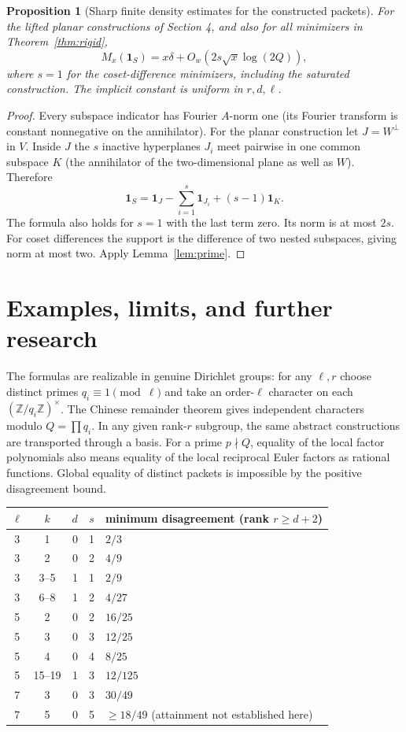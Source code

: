 \documentclass[11pt]{article}
\newtheorem{proposition}[theorem]{Proposition}
\theoremstyle{remark}\newtheorem{remark}[theorem]{Remark}
\newcommand{\Z}{\mathbb Z}
\newcommand{\ind}{\mathbf 1}
\begin{document}
\begin{proposition}[Sharp finite density estimates for the constructed packets]\label{prop:finiteext}
For the lifted planar constructions of Section 4, and also for all minimizers in Theorem~\ref{thm:rigid},
\[
 M_x(\ind_S)=x\delta+O_w(2s\sqrt x\log(2Q)),
\]
where $s=1$ for the coset-difference minimizers, including the saturated construction. The implicit constant is uniform in $r,d,\ell$.
\end{proposition}
\begin{proof}
Every subspace indicator has Fourier $A$-norm one (its Fourier transform is constant nonnegative on the annihilator). For the planar construction let $J=W^\perp$ in $V$. Inside $J$ the $s$ inactive hyperplanes $J_i$ meet pairwise in one common subspace $K$ (the annihilator of the two-dimensional plane as well as $W$). Therefore
\[
 \ind_S=\ind_J-\sum_{i=1}^s\ind_{J_i}+(s-1)\ind_K.
\]
The formula also holds for $s=1$ with the last term zero. Its norm is at most $2s$. For coset differences the support is the difference of two nested subspaces, giving norm at most two. Apply Lemma~\ref{lem:prime}.
\end{proof}

\section{Examples, limits, and further research}
The formulas are realizable in genuine Dirichlet groups: for any $\ell,r$ choose distinct primes $q_i\equiv1\pmod\ell$ and take an order-$\ell$ character on each $(\Z/q_i\Z)^\times$. The Chinese remainder theorem gives independent characters modulo $Q=\prod q_i$. In any given rank-$r$ subgroup, the same abstract constructions are transported through a basis. For a prime $p\nmid Q$, equality of the local factor polynomials also means equality of the local reciprocal Euler factors as rational functions. Global equality of distinct packets is impossible by the positive disagreement bound.

\begin{center}
\begin{tabular}{ccrrl}
\toprule
$\ell$ & $k$ & $d$ & $s$ & minimum disagreement (rank $r\ge d+2$)\\
\midrule
3 & 1 & 0 & 1 & $2/3$\\
3 & 2 & 0 & 2 & $4/9$\\
3 & 3--5 & 1 & 1 & $2/9$\\
3 & 6--8 & 1 & 2 & $4/27$\\
5 & 2 & 0 & 2 & $16/25$\\
5 & 3 & 0 & 3 & $12/25$\\
5 & 4 & 0 & 4 & $8/25$\\
5 & 15--19 & 1 & 3 & $12/125$\\
7 & 3 & 0 & 3 & $30/49$\\
7 & 5 & 0 & 5 & $\ge18/49$ (attainment not established here)\\
\bottomrule
\end{tabular}
\end{center}
\end{document}
